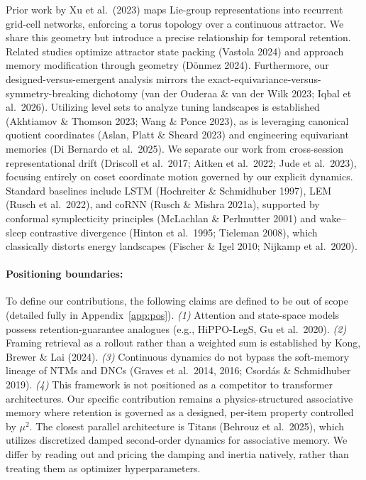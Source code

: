 \documentclass{article}
\begin{document}
Prior work by Xu et al.\ (2023) maps Lie-group representations into recurrent grid-cell networks, enforcing a torus topology over a continuous attractor. We share this geometry but introduce a precise relationship for temporal retention. Related studies optimize attractor state packing (Vastola 2024) and approach memory modification through geometry (D\"onmez 2024). Furthermore, our designed-versus-emergent analysis mirrors the exact-equivariance-versus-symmetry-breaking dichotomy (van der Ouderaa \& van der Wilk 2023; Iqbal et al.\ 2026). Utilizing level sets to analyze tuning landscapes is established (Akhtiamov \& Thomson 2023; Wang \& Ponce 2023), as is leveraging canonical quotient coordinates (Aslan, Platt \& Sheard 2023) and engineering equivariant memories (Di Bernardo et al.\ 2025). We separate our work from cross-session representational drift (Driscoll et al.\ 2017; Aitken et al.\ 2022; Jude et al.\ 2023), focusing entirely on coset coordinate motion governed by our explicit dynamics. Standard baselines include LSTM (Hochreiter \& Schmidhuber 1997), LEM (Rusch et al.\ 2022), and coRNN (Rusch \& Mishra 2021a), supported by conformal symplecticity principles (McLachlan \& Perlmutter 2001) and wake--sleep contrastive divergence (Hinton et al.\ 1995; Tieleman 2008), which classically distorts energy landscapes (Fischer \& Igel 2010; Nijkamp et al.\ 2020).

\paragraph{Positioning boundaries:} To define our contributions, the following claims are defined to be out of scope (detailed fully in Appendix~\ref{app:pos}). \emph{(1)} Attention and state-space models possess retention-guarantee analogues (e.g., HiPPO-LegS, Gu et al.\ 2020). \emph{(2)} Framing retrieval as a rollout rather than a weighted sum is established by Kong, Brewer \& Lai (2024). \emph{(3)} Continuous dynamics do not bypass the soft-memory lineage of NTMs and DNCs (Graves et al.\ 2014, 2016; Csord\'as \& Schmidhuber 2019). \emph{(4)} This framework is not positioned as a competitor to transformer architectures. Our specific contribution remains a physics-structured associative memory where retention is governed as a designed, per-item property controlled by $\mu^2$. The closest parallel architecture is Titans (Behrouz et al.\ 2025), which utilizes discretized damped second-order dynamics for associative memory. We differ by reading out and pricing the damping and inertia natively, rather than treating them as optimizer hyperparameters.
\end{document}
